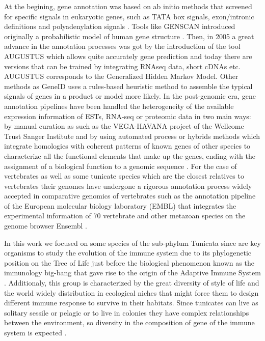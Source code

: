 \documentclass[11pt]{article}
\begin{document}
At the begining, gene annotation was based on ab initio methods that screened 
for  specific signals  in eukaryotic genes, such as TATA box signals, 
exon/intronic definitions and polyadenylation signals \cite{claverie}. Tools 
like GENSCAN introduced originally a probabilistic model of human gene structure 
\cite{genescan}. Then, in 2005 a great advance in the annotation processes was 
got by the introduction of the tool AUGUSTUS \cite{augustus} which allows quite 
accurately gene prediction and today there are versions that can be trained by 
integrating RNAseq data, short cDNAs etc. AUGUSTUS corresponds to the 
Generalized Hidden Markov Model. Other methods as GeneID \cite{Blanco:2007} uses 
a rules-based heuristic method to assemble the typical signals of genes in a 
product or model more likely. In the post-genomic era, gene annotation 
pipelines have been handled the heterogeneity of the available expression 
information of ESTs, RNA-seq or proteomic data in two main ways: by manual 
curation as such as the VEGA-HAVANA project of the Wellcome Trust Sanger 
Institute and by using automated process or hybrids methods which integrate 
homologies with coherent patterns of known genes of other species to 
characterize all the functional elements that make up the genes, ending with the 
assignment of a biological function to a genomic sequence \cite{aken2016ensembl} 
\cite{birney2004overview}. 
For the case of vertebrates as well as some tunicate species which are the 
closest relatives to vertebrates \cite{delsuc2006} their genomes have undergone 
a rigorous annotation process widely accepted in comparative genomics of 
vertebrates such as the annotation pipeline of the European molecular biology 
laboratory (EMBL) that integrates the experimental information of 70 vertebrate 
and other metazoan species on the genome browser Ensembl \cite{aken2016ensembl}.

In this work we focused on some species of the sub-phylum Tunicata since are 
key organisms to study the evolution of the immune system due to its 
phylogenetic position on the Tree of Life just before the biological phenomenon 
known as the immunology big-bang that gave rise to the origin of the Adaptive 
Immune System \cite{bernstein1996}. Additionaly, this group is characterized by 
the great diversity of style of life and the world widely distribution in 
ecological niches that might force them to design different immune response to 
survive in their habitats. Since tunicates can live as solitary sessile or 
pelagic or to live in colonies they have complex relationships between the 
environment, so diversity in the composition of gene of the immune system is 
expected  \cite{carroll2008evo, berna2014evolutionary}. 
\end{document}
